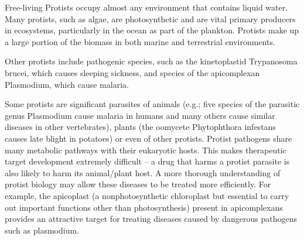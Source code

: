 Free-living Protists occupy almost any environment that contains liquid water. Many protists, such as algae, are photosynthetic and are vital primary producers in ecosystems, particularly in the ocean as part of the plankton. Protists make up a large portion of the biomass in both marine and terrestrial environments.

Other protists include pathogenic species, such as the kinetoplastid Trypanosoma brucei, which causes sleeping sickness, and species of the apicomplexan Plasmodium, which cause malaria.

Some protists are significant parasites of animals (e.g.; five species of the parasitic genus Plasmodium cause malaria in humans and many others cause similar diseases in other vertebrates), plants (the oomycete Phytophthora infestans causes late blight in potatoes) or even of other protists. Protist pathogens share many metabolic pathways with their eukaryotic hosts. This makes therapeutic target development extremely difficult -- a drug that harms a protist parasite is also likely to harm its animal/plant host. A more thorough understanding of protist biology may allow these diseases to be treated more efficiently. For example, the apicoplast (a nonphotosynthetic chloroplast but essential to carry out important functions other than photosynthesis) present in apicomplexans provides an attractive target for treating diseases caused by dangerous pathogens such as plasmodium.



